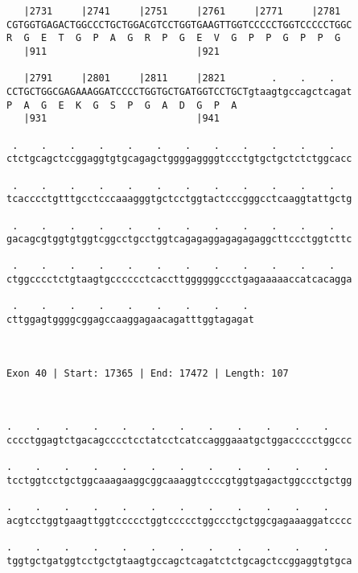 \documentclass{article}
\begin{document}
\begin{Verbatim}
   |2731     |2741     |2751     |2761     |2771     |2781  
CGTGGTGAGACTGGCCCTGCTGGACGTCCTGGTGAAGTTGGTCCCCCTGGTCCCCCTGGC
R  G  E  T  G  P  A  G  R  P  G  E  V  G  P  P  G  P  P  G  
   |911                          |921                       
  
   |2791     |2801     |2811     |2821        .    .    .   
CCTGCTGGCGAGAAAGGATCCCCTGGTGCTGATGGTCCTGCTgtaagtgccagctcagat
P  A  G  E  K  G  S  P  G  A  D  G  P  A                    
   |931                          |941                       
  
 .    .    .    .    .    .    .    .    .    .    .    .   
ctctgcagctccggaggtgtgcagagctggggaggggtccctgtgctgctctctggcacc
                                                            
 .    .    .    .    .    .    .    .    .    .    .    .   
tcacccctgtttgcctcccaaagggtgctcctggtactcccgggcctcaaggtattgctg
                                                            
 .    .    .    .    .    .    .    .    .    .    .    .   
gacagcgtggtgtggtcggcctgcctggtcagagaggagagagaggcttccctggtcttc
                                                            
 .    .    .    .    .    .    .    .    .    .    .    .   
ctggcccctctgtaagtgcccccctcaccttggggggccctgagaaaaaccatcacagga
                                                            
 .    .    .    .    .    .    .    .    . 
cttggagtggggcggagccaaggagaacagatttggtagagat
                                           
                                           
 
Exon 40 | Start: 17365 | End: 17472 | Length: 107



.    .    .    .    .    .    .    .    .    .    .    .    
cccctggagtctgacagcccctcctatcctcatccagggaaatgctggaccccctggccc
                                                            
.    .    .    .    .    .    .    .    .    .    .    .    
tcctggtcctgctggcaaagaaggcggcaaaggtccccgtggtgagactggccctgctgg
                                                            
.    .    .    .    .    .    .    .    .    .    .    .    
acgtcctggtgaagttggtccccctggtccccctggccctgctggcgagaaaggatcccc
                                                            
.    .    .    .    .    .    .    .    .    .    .    .    
tggtgctgatggtcctgctgtaagtgccagctcagatctctgcagctccggaggtgtgca
                                                            

\end{Verbatim}
\end{document}
